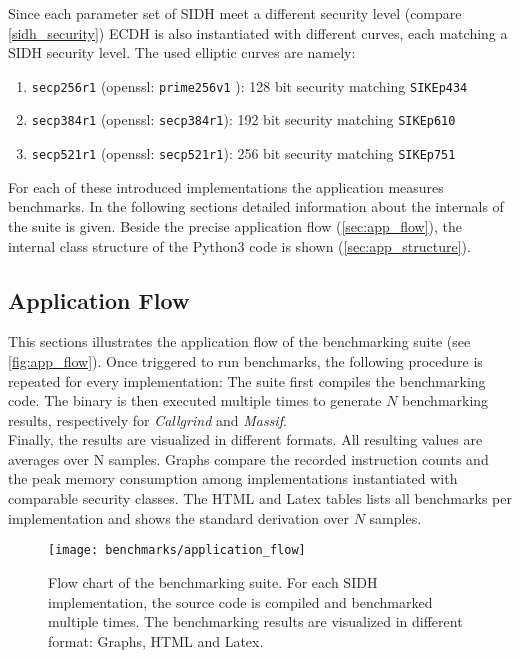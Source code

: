 Since each parameter set of SIDH meet a different security level (compare \autoref{sidh_security}) ECDH is also instantiated with different curves, each matching a SIDH security level. The used elliptic curves are namely:
\begin{enumerate}
\item \texttt{secp256r1} (openssl: \texttt{prime256v1} \parencite{turner2009elliptic}): 128 bit security matching \texttt{SIKEp434} \parencite{brown2010sec}
\item \texttt{secp384r1} (openssl: \texttt{secp384r1}): 192 bit security matching \texttt{SIKEp610} \parencite{brown2010sec}
\item \texttt{secp521r1} (openssl: \texttt{secp521r1}): 256 bit security  matching \texttt{SIKEp751} \parencite{brown2010sec}
\end{enumerate}
For each of these introduced implementations the application measures benchmarks. In the following sections detailed information about the internals of the suite is given. Beside the precise application flow (\autoref{sec:app_flow}), the internal class structure of the Python3 code is shown (\autoref{sec:app_structure}).

\subsection{Application Flow}\label{sec:app_flow}
This sections illustrates the application flow of the benchmarking suite (see \autoref{fig:app_flow}). Once triggered to run benchmarks, the following procedure is repeated for every implementation: The suite first compiles the benchmarking code. The binary is then executed multiple times to generate $N$ benchmarking results, respectively for \textit{Callgrind} and \textit{Massif}.
\\
Finally, the results are visualized in different formats. All resulting values are averages over N samples. Graphs compare the recorded instruction counts and the peak memory consumption among implementations instantiated with comparable security classes. The HTML and Latex tables lists all benchmarks per implementation and shows the standard derivation over $N$ samples.

\begin{figure}[H]
  \centering
  \texttt{[image: benchmarks/application\_flow]}
  \caption[Flow chart of the benchmarking suite.]
  {Flow chart of the benchmarking suite. For each SIDH implementation, the source code is compiled and benchmarked multiple times. The benchmarking results are visualized in different format: Graphs, HTML and Latex.
  } \label{fig:app_flow}
\end{figure}




